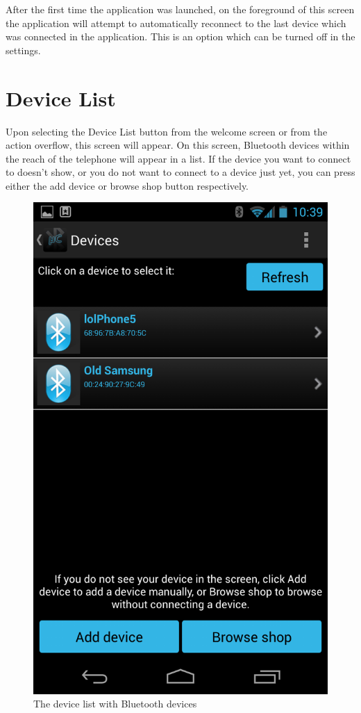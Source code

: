 \newline
After the first time the application was launched, on the foreground of this screen the application will attempt to automatically reconnect to the last device which was connected in the application. This is an option which can be turned off in the settings. 

\chapter{Device List}
Upon selecting the Device List button from the welcome screen or from the action overflow, this screen will appear. On this screen, Bluetooth devices within the reach of the telephone will appear in a list. If the device you want to connect to doesn't show, or you do not want to connect to a device just yet, you can press either the add device or browse shop button respectively.\\
\newline
\begin{figure}[H]
	\centering
	\includegraphics[scale = 0.3]{images/Screenshots/device_list.png}
	\caption{The device list with Bluetooth devices}
\end{figure}
